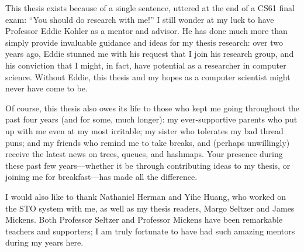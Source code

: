 This thesis exists because of a single sentence, uttered at the end of a CS61 final exam: ``You should do research with me!'' I still wonder at my luck to have Professor Eddie Kohler as a mentor and advisor. He has done much more than simply provide invaluable guidance and ideas for my thesis research: over two years ago, Eddie stunned me with his request that I join his research group, and his conviction that I might, in fact, have potential as a researcher in computer science. Without Eddie, this thesis and my hopes as a computer scientist might never have come to be.

    Of course, this thesis also owes its life to those who kept me going throughout the past four years (and for some, much longer): my ever-supportive parents who put up with me even at my most irritable; my sister who tolerates my bad thread puns; and my friends who remind me to take breaks, and (perhaps unwillingly) receive the latest news on trees, queues, and hashmaps. Your presence during these past few years---whether it be through contributing ideas to my thesis, or joining me for breakfast---has made all the difference.

        I would also like to thank Nathaniel Herman and Yihe Huang, who worked on the STO system with me, as well as my thesis readers, Margo Seltzer and James Mickens. Both Professor Seltzer and Professor Mickens have been remarkable teachers and supporters; I am truly fortunate to have had such amazing mentors during my years here.
